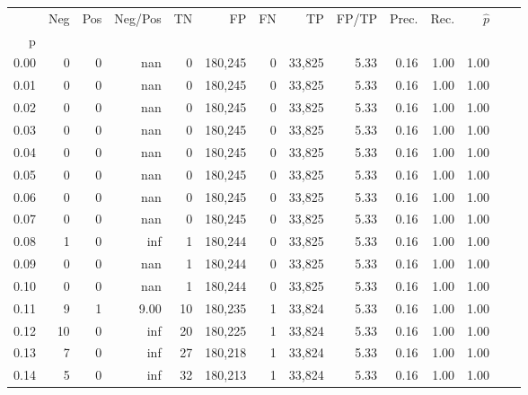 \begin{tabular}{rrrrrrrrrrrrrr}
\toprule
{} &    Neg &    Pos & Neg/Pos &       TN &       FP &      FN &      TP & FP/TP & Prec. &  Rec. & $\hat{p}$ \\
p    &        &        &         &          &          &         &         &       &       &       &           \\
\midrule
0.00 &      0 &      0 &     nan &        0 &  180,245 &       0 &  33,825 &  5.33 &  0.16 &  1.00 &      1.00 \\
0.01 &      0 &      0 &     nan &        0 &  180,245 &       0 &  33,825 &  5.33 &  0.16 &  1.00 &      1.00 \\
0.02 &      0 &      0 &     nan &        0 &  180,245 &       0 &  33,825 &  5.33 &  0.16 &  1.00 &      1.00 \\
0.03 &      0 &      0 &     nan &        0 &  180,245 &       0 &  33,825 &  5.33 &  0.16 &  1.00 &      1.00 \\
0.04 &      0 &      0 &     nan &        0 &  180,245 &       0 &  33,825 &  5.33 &  0.16 &  1.00 &      1.00 \\
0.05 &      0 &      0 &     nan &        0 &  180,245 &       0 &  33,825 &  5.33 &  0.16 &  1.00 &      1.00 \\
0.06 &      0 &      0 &     nan &        0 &  180,245 &       0 &  33,825 &  5.33 &  0.16 &  1.00 &      1.00 \\
0.07 &      0 &      0 &     nan &        0 &  180,245 &       0 &  33,825 &  5.33 &  0.16 &  1.00 &      1.00 \\
0.08 &      1 &      0 &     inf &        1 &  180,244 &       0 &  33,825 &  5.33 &  0.16 &  1.00 &      1.00 \\
0.09 &      0 &      0 &     nan &        1 &  180,244 &       0 &  33,825 &  5.33 &  0.16 &  1.00 &      1.00 \\
0.10 &      0 &      0 &     nan &        1 &  180,244 &       0 &  33,825 &  5.33 &  0.16 &  1.00 &      1.00 \\
0.11 &      9 &      1 &    9.00 &       10 &  180,235 &       1 &  33,824 &  5.33 &  0.16 &  1.00 &      1.00 \\
0.12 &     10 &      0 &     inf &       20 &  180,225 &       1 &  33,824 &  5.33 &  0.16 &  1.00 &      1.00 \\
0.13 &      7 &      0 &     inf &       27 &  180,218 &       1 &  33,824 &  5.33 &  0.16 &  1.00 &      1.00 \\
0.14 &      5 &      0 &     inf &       32 &  180,213 &       1 &  33,824 &  5.33 &  0.16 &  1.00 &      1.00 \\

\end{tabular}
